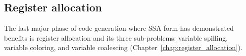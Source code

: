 \subsection{Register allocation}

The last major phase of code generation where SSA form has demonstrated benefits
is register allocation and its three sub-problems: variable spilling, variable
coloring, and variable coalescing (Chapter~\ref{chap:register_allocation}).

